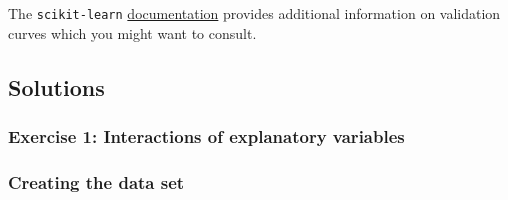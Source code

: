 \documentclass{scrartcl}
\begin{document}
The \texttt{scikit-learn}
\href{https://scikit-learn.org/stable/modules/learning_curve.html}{documentation}
provides additional information on validation curves which you might
want to consult.


\hypertarget{solutions}{%
\subsection{Solutions}\label{solutions}}

    \hypertarget{exercise-1-interactions-of-explanatory-variables}{%
\subsubsection{Exercise 1: Interactions of explanatory
variables}\label{exercise-1-interactions-of-explanatory-variables}}

    \hypertarget{creating-the-data-set}{%
\subsubsection*{Creating the data set}\label{creating-the-data-set}}
\end{document}
